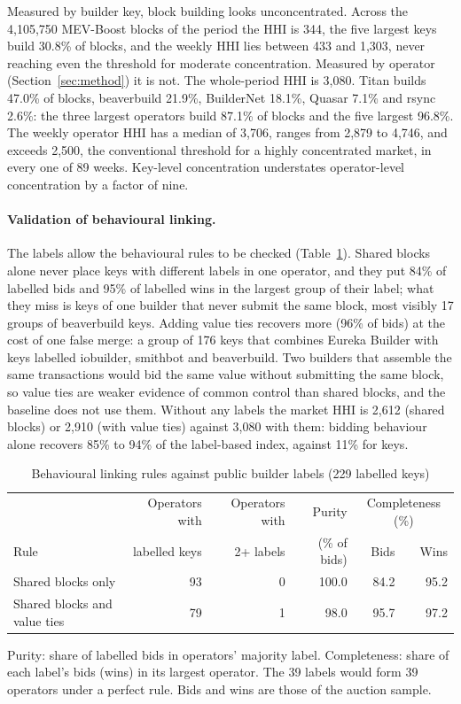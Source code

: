 \documentclass[11pt]{article}
\begin{document}
Measured by builder key, block building looks unconcentrated. Across the
4,105,750 MEV-Boost blocks of the period the HHI is 344, the five largest
keys build 30.8\% of blocks, and the weekly HHI lies between 433 and 1,303,
never reaching even the threshold for moderate concentration. Measured by
operator (Section~\ref{sec:method}) it is not. The whole-period HHI is 3,080.
Titan builds 47.0\% of blocks, beaverbuild 21.9\%, BuilderNet 18.1\%, Quasar
7.1\% and rsync 2.6\%: the three largest operators build 87.1\% of blocks
and the five largest 96.8\%. The weekly operator HHI has a median of 3,706,
ranges from 2,879 to 4,746, and exceeds 2,500, the conventional threshold
for a highly concentrated market, in every one of 89 weeks. Key-level
concentration understates operator-level concentration by a factor of nine.

\paragraph{Validation of behavioural linking.} The labels allow the
behavioural rules to be checked (Table~\ref{tab:validation}). Shared blocks
alone never place keys with different labels in one operator, and they put
84\% of labelled bids and 95\% of labelled wins in the largest group of
their label; what they miss is keys of one builder that never submit the
same block, most visibly 17 groups of beaverbuild keys. Adding value ties
recovers more (96\% of bids) at the cost of one false merge: a group of 176
keys that combines Eureka Builder with keys labelled iobuilder, smithbot and
beaverbuild. Two builders that assemble the same transactions would bid the
same value without submitting the same block, so value ties are weaker
evidence of common control than shared blocks, and the baseline does not use
them. Without any labels the market HHI is 2,612 (shared blocks) or 2,910
(with value ties) against 3,080 with them: bidding behaviour alone recovers
85\% to 94\% of the label-based index, against 11\% for keys.

\begin{table}[!htbp]
\centering
\small
\caption{Behavioural linking rules against public builder labels (229
labelled keys)}
\label{tab:validation}
\begin{tabular}{lrrrrr}
\toprule
 & Operators with & Operators with & Purity & \multicolumn{2}{c}{Completeness (\%)} \\
Rule & labelled keys & 2+ labels & (\% of bids) & Bids & Wins \\
\midrule
Shared blocks only & 93 & 0 & 100.0 & 84.2 & 95.2 \\
Shared blocks and value ties & 79 & 1 & 98.0 & 95.7 & 97.2 \\
\bottomrule
\end{tabular}

\vspace{0.5em}
\footnotesize Purity: share of labelled bids in operators' majority label.
Completeness: share of each label's bids (wins) in its largest operator.
The 39 labels would form 39 operators under a perfect rule. Bids and wins
are those of the auction sample.
\end{table}
\end{document}
